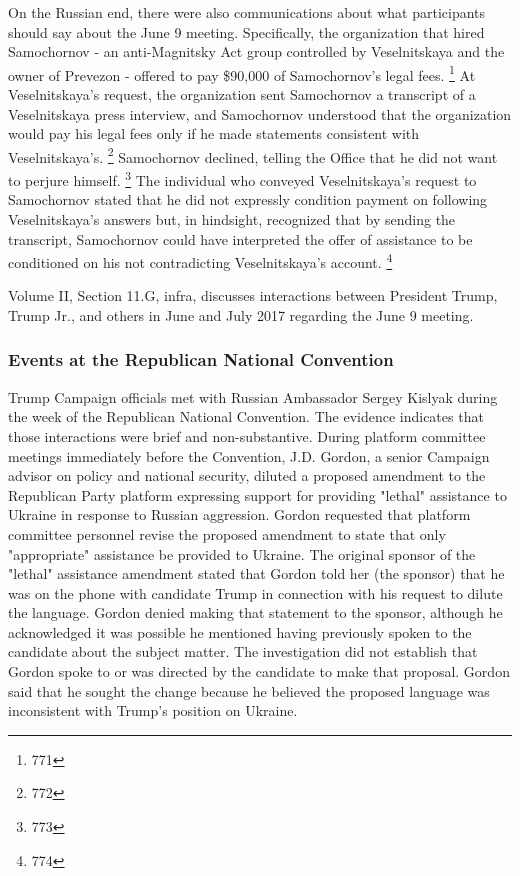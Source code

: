 On the Russian end, there were also communications about what participants should say about the June 9 meeting.
Specifically, the organization that hired Samochornov - an anti-Magnitsky Act group controlled by Veselnitskaya and the owner of Prevezon - offered to pay \$90,000 of Samochornov's legal fees.%
\footnote{771}
At Veselnitskaya's request, the organization sent Samochornov a transcript of a Veselnitskaya press interview, and Samochornov understood that the organization would pay his legal fees only if he made statements consistent with Veselnitskaya's.%
\footnote{772}
Samochornov declined, telling the Office that he did not want to perjure himself.%
\footnote{773}
The individual who conveyed Veselnitskaya's request to Samochornov stated that he did not expressly condition payment on following Veselnitskaya's answers but, in hindsight, recognized that by sending the transcript, Samochornov could have interpreted the offer of assistance to be conditioned on his not contradicting Veselnitskaya's account.%
\footnote{774}

Volume II, Section 11.G, infra, discusses interactions between President Trump, Trump Jr., and others in June and July 2017 regarding the June 9 meeting.

\subsubsection{Events at the Republican National Convention}

Trump Campaign officials met with Russian Ambassador Sergey Kislyak during the week of the Republican National Convention.
The evidence indicates that those interactions were brief and non-substantive.
During platform committee meetings immediately before the Convention, J.D. Gordon, a senior Campaign advisor on policy and national security, diluted a proposed amendment to the Republican Party platform expressing support for providing "lethal" assistance to Ukraine in response to Russian aggression.
Gordon requested that platform committee personnel revise the proposed amendment to state that only "appropriate" assistance be provided to Ukraine.
The original sponsor of the "lethal" assistance amendment stated that Gordon told her (the sponsor) that he was on the phone with candidate Trump in connection with his request to dilute the language.
Gordon denied making that statement to the sponsor, although he acknowledged it was possible he mentioned having previously spoken to the candidate about the subject matter.
The investigation did not establish that Gordon spoke to or was directed by the candidate to make that proposal.
Gordon said that he sought the change because he believed the proposed language was inconsistent with Trump's position on Ukraine.

